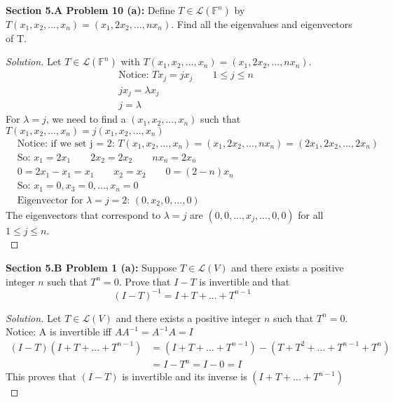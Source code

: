 \documentclass[12pt]{article}
\begin{document}
\noindent \textbf{Section 5.A Problem 10 (a): }Define $T \in \mathcal{L}(\mathbb{F}^n)$ by $T(x_1,x_2,...,x_n) = (x_1,2x_2,...,nx_n)$. Find all the eigenvalues and eigenvectors of T.
	\begin{proof}[Solution]
		Let $T \in \mathcal{L}(\mathbb{F}^n)$ with $T(x_1,x_2,...,x_n) = (x_1,2x_2,...,nx_n)$.
		\begin{align*}
			&\text{Notice: } Tx_j = jx_j \qquad 1 \leq j \leq n \\
			&jx_j = \lambda x_j \\
			&j = \lambda
		\end{align*}
		For $\lambda = j$, we need to find a $(x_1,x_2,...,x_n)$ such that $T(x_1,x_2,...,x_n) = j(x_1,x_2,...,x_n)$
		\begin{align*}
			&\text{Notice: if we set j = 2: } T(x_1,x_2,...,x_n) = (x_1,2x_2,...,nx_n) = (2x_1, 2x_2,...,2x_n) \\
			&\text{So: } x_1 = 2x_1 \qquad 2x_2 = 2x_2 \qquad nx_n = 2x_n \\
			&0 = 2x_1 - x_1 = x_1 \qquad x_2 = x_2 \qquad 0 = (2-n)x_n \\
			&\text{So: } x_1 = 0 , x_3 = 0, ..., x_n = 0 \\
			&\text{Eigenvector for $\lambda = j = 2$: } (0,x_2,0, ..., 0)
		\end{align*}
		The eigenvectors that correspond to $\lambda = j$ are $(0 , 0, ..., x_j , ... , 0, 0 )$ for all $1 \leq j \leq n$. \\
	\end{proof}
\vspace{\baselineskip}

\noindent \textbf{Section 5.B Problem 1 (a): }Suppose $T \in \mathcal{L}(V)$ and there exists a positive integer $n$ such that $T^n = 0$. Prove that $I - T$ is invertible and that 
$$ (I - T)^{-1} = I + T + ... + T^{n-1} $$
	\begin{proof}[Solution]
		Let $T \in \mathcal{L}(V)$ and there exists a positive integer $n$ such that $T^n = 0$. Notice: A is invertible iff $AA^{-1} = A^{-1}A = I$
		\begin{align*}
			(I - T)(I + T + ... + T^{n-1}) &= (I + T + ... + T^{n-1}) - (T + T^2 + ... + T^{n-1} + T^n) \\
			&= I - T^n = I - 0 = I		
		\end{align*}
		This proves that $(I - T)$ is invertible and its inverse is $(I + T + ... + T^{n-1})$ \\
	\end{proof}
\vspace{\baselineskip}
\end{document}
